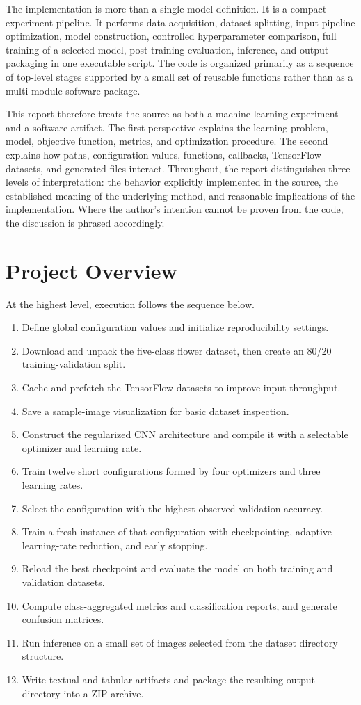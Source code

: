 \documentclass[11pt,a4paper]{article}
\begin{document}
The implementation is more than a single model definition. It is a compact experiment pipeline. It performs data acquisition, dataset splitting, input-pipeline optimization, model construction, controlled hyperparameter comparison, full training of a selected model, post-training evaluation, inference, and output packaging in one executable script. The code is organized primarily as a sequence of top-level stages supported by a small set of reusable functions rather than as a multi-module software package.

This report therefore treats the source as both a machine-learning experiment and a software artifact. The first perspective explains the learning problem, model, objective function, metrics, and optimization procedure. The second explains how paths, configuration values, functions, callbacks, TensorFlow datasets, and generated files interact. Throughout, the report distinguishes three levels of interpretation: the behavior explicitly implemented in the source, the established meaning of the underlying method, and reasonable implications of the implementation. Where the author's intention cannot be proven from the code, the discussion is phrased accordingly.

\section{Project Overview}
At the highest level, execution follows the sequence below.

\begin{enumerate}[leftmargin=1.7em]
\item Define global configuration values and initialize reproducibility settings.
\item Download and unpack the five-class flower dataset, then create an 80/20 training-validation split.
\item Cache and prefetch the TensorFlow datasets to improve input throughput.
\item Save a sample-image visualization for basic dataset inspection.
\item Construct the regularized CNN architecture and compile it with a selectable optimizer and learning rate.
\item Train twelve short configurations formed by four optimizers and three learning rates.
\item Select the configuration with the highest observed validation accuracy.
\item Train a fresh instance of that configuration with checkpointing, adaptive learning-rate reduction, and early stopping.
\item Reload the best checkpoint and evaluate the model on both training and validation datasets.
\item Compute class-aggregated metrics and classification reports, and generate confusion matrices.
\item Run inference on a small set of images selected from the dataset directory structure.
\item Write textual and tabular artifacts and package the resulting output directory into a ZIP archive.
\end{enumerate}
\end{document}
